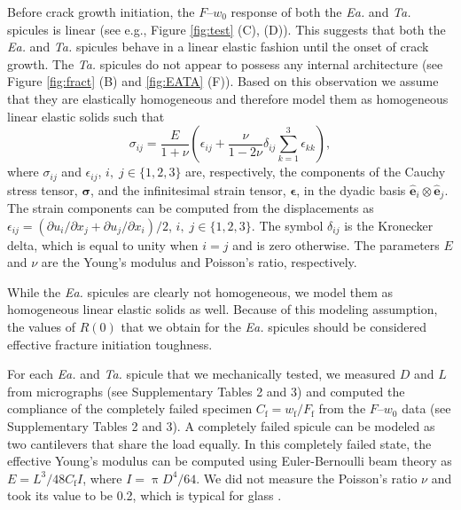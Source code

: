 \documentclass[12pt,onecolumn]{article}
\makeatletter
\newcommand{\ei}{\hat{\mathbf{e}}_i}
\newcommand{\ej}{\hat{\mathbf{e}}_j}
\newcommand{\TA}{\textit{Ta.\@}\xspace}
\newcommand{\EA}{\textit{Ea.\@}\xspace}
\makeatother
\begin{document}
\begin{bibunit}
Before crack growth initiation, the $F$--$w_0$ response of both the \EA and \TA spicules is linear (see e.g., Figure \ref{fig:test} (C), (D)). This suggests that both the \EA and \TA spicules behave in a linear elastic fashion until the onset of crack growth.
%
The \TA spicules do not appear to possess any internal architecture (see Figure \ref{fig:fract} (B) and \ref{fig:EATA} (F)). Based on this observation we assume that they are elastically homogeneous and therefore model them as homogeneous linear elastic solids such that
%
\begin{equation}
\label{eq:LE}
    \sigma_{ij}=\frac{E}{1+\nu}\left(\epsilon_{ij}+\frac{\nu}{1-2\nu}\delta_{ij}\sum_{k=1}^{3}\epsilon_{kk}\right),
\end{equation}
%
where $\sigma_{ij}$ and $\epsilon_{ij}$, $i,\;j\in\{1,2,3\}$ are, respectively, the components of the Cauchy stress tensor, $\bm{\sigma}$, and the infinitesimal strain tensor, $\bm{\epsilon}$, in the dyadic basis $\ei \otimes \ej$. The strain components can be computed from the displacements as $\epsilon_{ij}=(\partial u_i/\partial x_j+\partial u_j/\partial x_i)/2$, $i,\;j\in\{1,2,3\}$. The symbol $\delta_{ij}$ is the Kronecker delta, which is equal to unity when $i=j$ and is zero otherwise. The parameters $E$ and $\nu$ are the Young's modulus and Poisson's ratio, respectively.


While the \EA spicules are clearly not homogeneous, we model them as homogeneous linear elastic solids as well. Because of this modeling assumption, the values of $R(0)$ that we obtain for the \EA spicules should be considered effective fracture initiation toughness.

For each \EA and \TA spicule that we mechanically tested, we measured $D$ and $L$ from micrographs (see Supplementary Tables 2 and 3) and computed the compliance of the completely failed specimen $C_\mathrm{f}=w_\mathrm{f}/F_\mathrm{f}$ from the $F$--$w_0$ data (see Supplementary Tables 2 and 3). A completely failed spicule can be modeled as two cantilevers that share the load equally. In this completely failed state, the effective Young's modulus can be computed using Euler-Bernoulli beam theory as $E=L^3/48C_\mathrm{f} I$, where $I=\uppi D^4/64$.  We did not measure the Poisson's ratio $\nu$ and took its value to be 0.2, which is typical for glass \cite{davidge1968effective}.


\end{bibunit}
\end{document}
